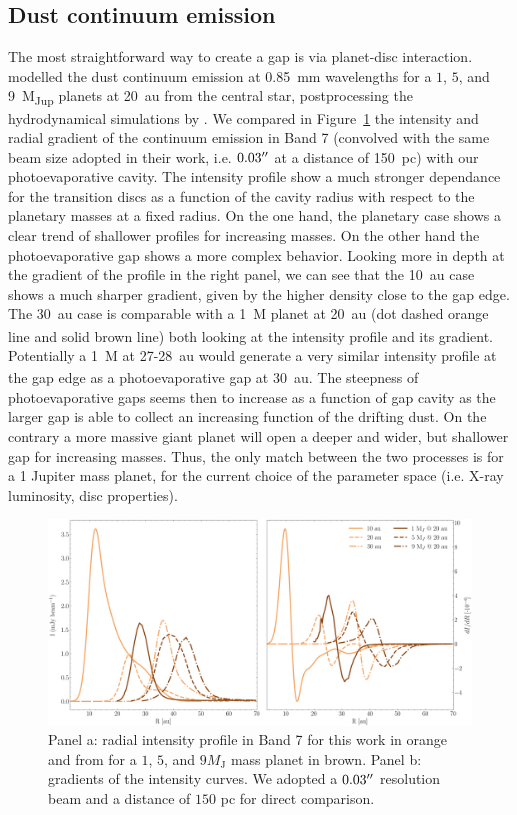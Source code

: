 \documentclass[fleqn,usenatbib]{mnras}
\begin{document}
    \subsection{Dust continuum emission}
    The most straightforward way to create a gap is via planet-disc interaction. \citet{Facchini2018} modelled the dust continuum emission at \SI{0.85}{mm} wavelengths for a $1$, $5$, and \SI{9}{M_{Jup}} planets at \SI{20}{au} from the central star, postprocessing the hydrodynamical simulations by \cite{Ovelar2016}. We compared in Figure~\ref{fig:Grad} the intensity and radial gradient of the continuum emission in Band 7 (convolved with the same beam size adopted in their work, i.e. $0.03 \hbox{$^{\prime\prime}$}$ at a distance of \SI{150}{pc}) with our photoevaporative cavity. The intensity profile show a much stronger dependance for the transition discs as a function of the cavity radius with respect to the planetary masses at a fixed radius. On the one hand, the planetary case shows a clear trend of shallower profiles for increasing masses. On the other hand the photoevaporative gap shows a more complex behavior. Looking more in depth at the gradient of the profile in the right panel, we can see that the \SI{10}{au} case shows a much sharper gradient, given by the higher density close to the gap edge. The \SI{30}{au} case is comparable with a \SI{1}{M_\J} planet at \SI{20}{au} (dot dashed orange line and solid brown line) both looking at the intensity profile and its gradient. Potentially a \SI{1}{M_\J} at 27-\SI{28}{au} would generate a very similar intensity profile at the gap edge as a photoevaporative gap at \SI{30}{au}. The steepness of photoevaporative gaps seems then to increase as a function of gap cavity as the larger gap is able to collect an increasing function of the drifting dust. On the contrary a more massive giant planet will open a deeper and wider, but shallower gap for increasing masses. Thus, the only match between the two processes is for a 1 Jupiter mass planet, for the current choice of the parameter space (i.e. X-ray luminosity, disc properties).
    \begin{figure}
        \centering
        \includegraphics[width=\textwidth]{Fig6}
        \caption{Panel a: radial intensity profile in Band 7 for this work in orange and from \citet{Ovelar2016,Facchini2018} for a $1$, $5$, and $9 M_\mathrm{J}$ mass planet in brown. Panel b: gradients of the intensity curves. We adopted a $0.03 \hbox{$^{\prime\prime}$}$ resolution beam and a distance of $150$ pc for direct comparison.}
        \label{fig:Grad}
    \end{figure}
    
\end{document}
